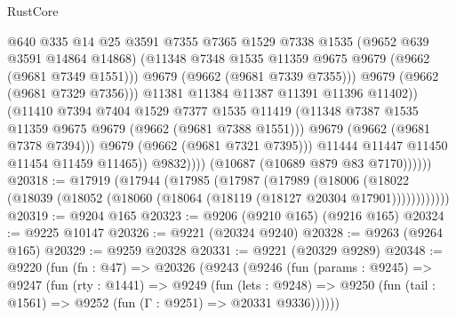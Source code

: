 \begin{lexlean}{RustCore}
\begin{coremodule}
                                  @640
                                  @335
                                  @14
                                  @25
                                  @3591
                                  @7355
                                  @7365
                                  @1529
                                  @7338
                                  @1535
                                  (@9652 @639 @3591 @14864 @14868)
                                  (@11348
                                    @7348
                                    @1535
                                    @11359
                                    @9675
                                    @9679
                                    (@9662 (@9681 @7349 @1551)))
                                  @9679
                                  (@9662 (@9681 @7339 @7355)))
                                @9679
                                (@9662 (@9681 @7329 @7356)))
                              @11381
                              @11384
                              @11387
                              @11391
                              @11396
                              @11402))
                          (@11410
                            @7394
                            @7404
                            @1529
                            @7377
                            @1535
                            @11419
                            (@11348 @7387 @1535 @11359 @9675 @9679 (@9662 (@9681 @7388 @1551)))
                            @9679
                            (@9662 (@9681 @7378 @7394)))
                          @9679
                          (@9662 (@9681 @7321 @7395)))
                        @11444
                        @11447
                        @11450
                        @11454
                        @11459
                        @11465))
                    @9832))))
            (@10687 (@10689 @879 @83 @7170))))))
@20318 := @17919
    (@17944
      (@17985
        (@17987
          (@17989
            (@18006
              (@18022 (@18039 (@18052 (@18060 (@18064 (@18119 (@18127 @20304 @17901))))))))))))
@20319 := @9204 @165
@20323 := @9206 (@9210 @165) (@9216 @165)
@20324 := @9225 @10147
@20326 := @9221 (@20324 @9240)
@20328 := @9263 (@9264 @165)
@20329 := @9259 @20328
@20331 := @9221 (@20329 @9289)
@20348 := @9220
    (fun (fn : @47) =>
    @20326
      (@9243
        (@9246
          (fun (params : @9245) =>
          @9247
            (fun (rty : @1441) =>
            @9249
              (fun (lets : @9248) =>
              @9250 (fun (tail : @1561) => @9252 (fun (Γ : @9251) => @20331 @9336))))))

\end{coremodule}
\end{lexlean}
